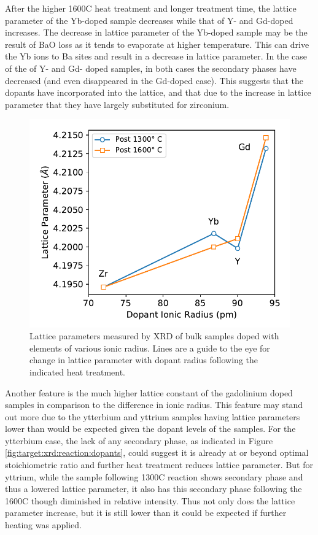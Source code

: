 After the higher 1600\textdegree C heat treatment and longer treatment time, the lattice parameter of the Yb-doped sample decreases while that of Y- and Gd-doped increases. The decrease in lattice parameter of the Yb-doped sample may be the result of BaO loss as it tends to evaporate at higher temperature. This can drive the Yb ions to Ba sites and result in a decrease in lattice parameter. In the case of the of Y- and Gd- doped samples, in both cases the secondary phases have decreased (and even disappeared in the Gd-doped case). This suggests that the dopants have incorporated into the lattice, and that due to the increase in lattice parameter that they have largely substituted for zirconium. 
\begin{figure}
    \centering
    \includegraphics{Figures/190614-pellet-dopant-latticeParam-radius.pdf}
    \caption{Lattice parameters measured by XRD of bulk samples doped with elements of various ionic radius. Lines are a guide to the eye for change in lattice parameter with dopant radius following the indicated heat treatment.}
    \label{fig:bulk:xrd:latticeParamDopantRadius}
\end{figure}

Another feature is the much higher lattice constant of the gadolinium doped samples in comparison to the difference in ionic radius. This feature may stand out more due to the ytterbium and yttrium samples having lattice parameters lower than would be expected given the dopant levels of the samples. For the ytterbium case, the lack of any secondary phase, as indicated in Figure \ref{fig:target:xrd:reaction:dopants}, could suggest it is already at or beyond optimal stoichiometric ratio and further heat treatment reduces lattice parameter. But for yttrium, while the sample following 1300\textdegree C reaction shows secondary phase and thus a lowered lattice parameter, it also has this secondary phase following the 1600\textdegree C though diminished in relative intensity. Thus not only does the lattice parameter increase, but it is still lower than it could be expected if further heating was applied. 

